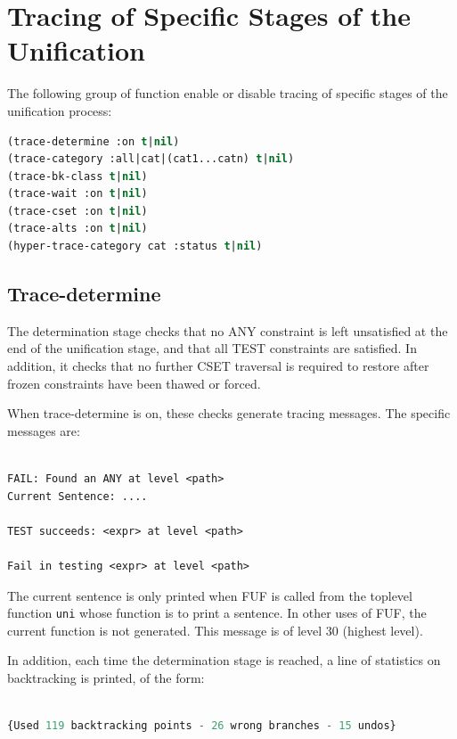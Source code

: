 \documentclass[10pt,a4paper]{report}
\begin{document}
\section{Tracing of Specific Stages of the Unification}

The following group of function enable or disable tracing of specific
stages of the unification process:

\begin{lstlisting}[language=Lisp]
(trace-determine :on t|nil) 
(trace-category :all|cat|(cat1...catn) t|nil)
(trace-bk-class t|nil)  
(trace-wait :on t|nil)
(trace-cset :on t|nil)
(trace-alts :on t|nil)
(hyper-trace-category cat :status t|nil)
\end{lstlisting}

\subsection{Trace-determine}

The determination stage checks that no ANY constraint is left unsatisfied
at the end of the unification stage, and that all TEST constraints are
satisfied.  In addition, it checks that no further CSET traversal is
required to restore after frozen constraints have been thawed or forced.

When trace-determine is on, these checks generate tracing messages.  The
specific messages are:

\begin{lstlisting}[language=Lisp]

FAIL: Found an ANY at level <path>
Current Sentence: ....

TEST succeeds: <expr> at level <path>

Fail in testing <expr> at level <path>
\end{lstlisting}

The current sentence is only printed when FUF is called from the toplevel
function {\tt uni} whose function is to print a sentence.  In other uses of
FUF, the current function is not generated.  This message is of level 30
(highest level).

In addition, each time the determination stage is reached, a line of
statistics on backtracking is printed, of the form:

\begin{lstlisting}[language=Lisp]

{Used 119 backtracking points - 26 wrong branches - 15 undos}

\end{lstlisting}
\end{document}
